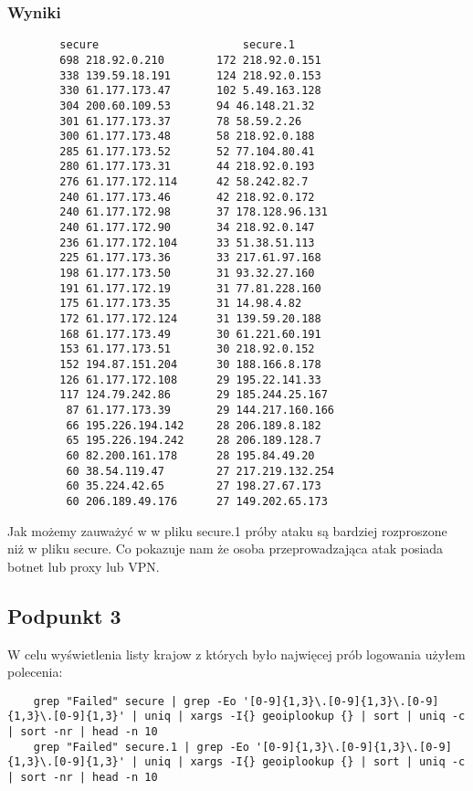 \documentclass{article}
\begin{document}
\subsubsection{Wyniki}
\begin{verbatim}
        secure                      secure.1
        698 218.92.0.210        172 218.92.0.151
        338 139.59.18.191       124 218.92.0.153
        330 61.177.173.47       102 5.49.163.128
        304 200.60.109.53       94 46.148.21.32
        301 61.177.173.37       78 58.59.2.26
        300 61.177.173.48       58 218.92.0.188
        285 61.177.173.52       52 77.104.80.41
        280 61.177.173.31       44 218.92.0.193
        276 61.177.172.114      42 58.242.82.7
        240 61.177.173.46       42 218.92.0.172
        240 61.177.172.98       37 178.128.96.131
        240 61.177.172.90       34 218.92.0.147
        236 61.177.172.104      33 51.38.51.113
        225 61.177.173.36       33 217.61.97.168
        198 61.177.173.50       31 93.32.27.160
        191 61.177.172.19       31 77.81.228.160
        175 61.177.173.35       31 14.98.4.82
        172 61.177.172.124      31 139.59.20.188
        168 61.177.173.49       30 61.221.60.191
        153 61.177.173.51       30 218.92.0.152
        152 194.87.151.204      30 188.166.8.178
        126 61.177.172.108      29 195.22.141.33
        117 124.79.242.86       29 185.244.25.167
         87 61.177.173.39       29 144.217.160.166
         66 195.226.194.142     28 206.189.8.182
         65 195.226.194.242     28 206.189.128.7
         60 82.200.161.178      28 195.84.49.20
         60 38.54.119.47        27 217.219.132.254
         60 35.224.42.65        27 198.27.67.173
         60 206.189.49.176      27 149.202.65.173
\end{verbatim}    
Jak możemy zauważyć w w pliku secure.1 próby ataku są bardziej rozproszone niż w pliku secure. Co pokazuje nam że osoba przeprowadzająca atak posiada botnet lub proxy lub VPN.
\subsection{Podpunkt 3}
W celu wyświetlenia listy krajow z których było najwięcej prób logowania użyłem polecenia:
\begin{verbatim}
    grep "Failed" secure | grep -Eo '[0-9]{1,3}\.[0-9]{1,3}\.[0-9]{1,3}\.[0-9]{1,3}' | uniq | xargs -I{} geoiplookup {} | sort | uniq -c | sort -nr | head -n 10
    grep "Failed" secure.1 | grep -Eo '[0-9]{1,3}\.[0-9]{1,3}\.[0-9]{1,3}\.[0-9]{1,3}' | uniq | xargs -I{} geoiplookup {} | sort | uniq -c | sort -nr | head -n 10
\end{verbatim}
\end{document}

